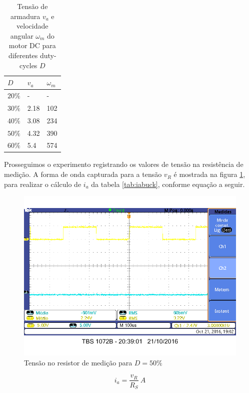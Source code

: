 \documentclass{article}
\begin{document}
\begin{table}[H]
	\centering
	\caption{Tensão de armadura $v_a$ e velocidade angular $\omega_m$ do motor DC para diferentes duty-cycles $D$}
	\label{tab:vabuck}
	\begin{tabular}{|l|l|l|}
		\hline
		$D$    & $v_a$ & $\omega_m$ \\ \hline
		$20\%$ & -     & -          \\ \hline
		$30\%$ & 2.18  & 102        \\ \hline
		$40\%$ & 3.08  & 234        \\ \hline
		$50\%$ & 4.32  & 390        \\ \hline
		$60\%$ & 5.4   & 574        \\ \hline
	\end{tabular}
\end{table}

Prosseguimos o experimento registrando os valores de tensão na resistência de medição. A forma de onda capturada para a tensão $v_R$ é mostrada na figura \ref{fig:iabuck}, para realizar o cálculo de $i_a$ da tabela \ref{tab:iabuck}, conforme equação a seguir.

\begin{figure}[H]
	\centering
	\includegraphics[width=\linewidth]{Dados/Buck/ia.bmp}
	\caption{Tensão no resistor de medição para $D=50\%$}
	\label{fig:iabuck}
\end{figure}

\begin{equation}
i_a=\frac{v_R}{R_S}\ A
\end{equation}
\end{document}
